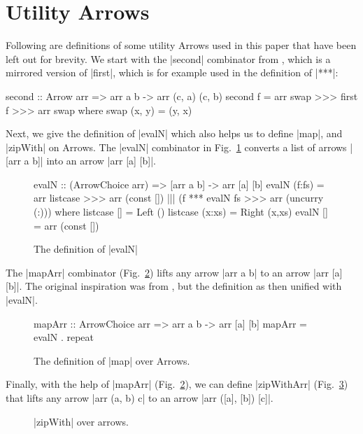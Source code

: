 \section{Utility Arrows}\label{utilfns}
Following are definitions of some utility Arrows used in this paper that have been left out for brevity.
We start with the |second| combinator from \citet{HughesArrows}, which is a mirrored version of |first|, which is for example used in the definition of |***|: 
\begin{code}
second :: Arrow arr => arr a b -> arr (c, a) (c, b)
second f = arr swap >>> first f >>> arr swap
	where swap (x, y) = (y, x)
\end{code}

Next, we give the definition of |evalN| which also helps us to define |map|, and |zipWith| on Arrows.
The |evalN| combinator in Fig.~\ref{fig:evalN} converts a list of arrows |[arr a b]| into an arrow |arr [a] [b]|.

\begin{figure}[h]
\begin{code}
evalN :: (ArrowChoice arr) => [arr a b] -> arr [a] [b]
evalN (f:fs) = arr listcase >>>
         arr (const []) ||| (f *** evalN fs >>> arr (uncurry (:)))
         where listcase []     = Left ()
               listcase (x:xs) = Right (x,xs)
evalN [] = arr (const [])
\end{code}
\caption{The definition of |evalN|}
\label{fig:evalN}
\end{figure}

The |mapArr| combinator (Fig.~\ref{fig:mapArr}) lifts any arrow |arr a
b| to an arrow |arr [a] [b]|. The original inspiration was from \cite{programming_with_arrows},
but the definition as then unified with |evalN|. 

\begin{figure}[h]
\begin{code}
mapArr :: ArrowChoice arr => arr a b -> arr [a] [b]
mapArr = evalN . repeat
\end{code}
\caption{The definition of |map| over Arrows.}
\label{fig:mapArr}
\end{figure}

Finally, with the help of |mapArr| (Fig.~\ref{fig:mapArr}), we can define |zipWithArr|  (Fig.~\ref{fig:zipWithArr}) that lifts any arrow |arr (a, b) c| to an arrow |arr ([a], [b]) [c]|.
\begin{figure}[h]
\caption{|zipWith| over arrows.}
\label{fig:zipWithArr}
\end{figure}

